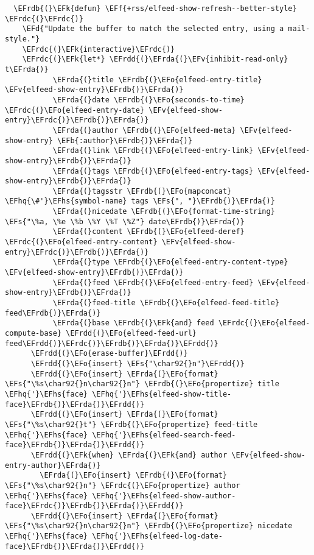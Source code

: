 \documentclass[c]{article}
\theoremstyle{plain}%
\theoremstyle{definition}
\theoremstyle{remark}
\newcommand{\EFs}[1]{\textcolor{EFs}{#1}} %
\newcommand{\EFd}[1]{\textcolor{EFd}{#1}} %
\newcommand{\EFk}[1]{\textcolor{EFk}{#1}} %
\newcommand{\EFb}[1]{\textcolor{EFb}{#1}} %
\newcommand{\EFf}[1]{\textcolor{EFf}{#1}} %
\newcommand{\EFv}[1]{\textcolor{EFv}{#1}} %
\newcommand{\EFo}[1]{\textcolor{EFo}{#1}} %
\newcommand{\EFhq}[1]{\textcolor{EFhq}{#1}} %
\newcommand{\EFhs}[1]{\textcolor{EFhs}{#1}} %
\newcommand{\EFrda}[1]{\textcolor{EFrda}{#1}} %
\newcommand{\EFrdb}[1]{\textcolor{EFrdb}{#1}} %
\newcommand{\EFrdc}[1]{\textcolor{EFrdc}{#1}} %
\newcommand{\EFrdd}[1]{\textcolor{EFrdd}{#1}} %
\begin{document}
\begin{Code}
\begin{Verbatim}
  \EFrdb{(}\EFk{defun} \EFf{+rss/elfeed-show-refresh--better-style} \EFrdc{(}\EFrdc{)}
    \EFd{"Update the buffer to match the selected entry, using a mail-style."}
    \EFrdc{(}\EFk{interactive}\EFrdc{)}
    \EFrdc{(}\EFk{let*} \EFrdd{(}\EFrda{(}\EFv{inhibit-read-only} t\EFrda{)}
           \EFrda{(}title \EFrdb{(}\EFo{elfeed-entry-title} \EFv{elfeed-show-entry}\EFrdb{)}\EFrda{)}
           \EFrda{(}date \EFrdb{(}\EFo{seconds-to-time} \EFrdc{(}\EFo{elfeed-entry-date} \EFv{elfeed-show-entry}\EFrdc{)}\EFrdb{)}\EFrda{)}
           \EFrda{(}author \EFrdb{(}\EFo{elfeed-meta} \EFv{elfeed-show-entry} \EFb{:author}\EFrdb{)}\EFrda{)}
           \EFrda{(}link \EFrdb{(}\EFo{elfeed-entry-link} \EFv{elfeed-show-entry}\EFrdb{)}\EFrda{)}
           \EFrda{(}tags \EFrdb{(}\EFo{elfeed-entry-tags} \EFv{elfeed-show-entry}\EFrdb{)}\EFrda{)}
           \EFrda{(}tagsstr \EFrdb{(}\EFo{mapconcat} \EFhq{\#'}\EFhs{symbol-name} tags \EFs{", "}\EFrdb{)}\EFrda{)}
           \EFrda{(}nicedate \EFrdb{(}\EFo{format-time-string} \EFs{"\%a, \%e \%b \%Y \%T \%Z"} date\EFrdb{)}\EFrda{)}
           \EFrda{(}content \EFrdb{(}\EFo{elfeed-deref} \EFrdc{(}\EFo{elfeed-entry-content} \EFv{elfeed-show-entry}\EFrdc{)}\EFrdb{)}\EFrda{)}
           \EFrda{(}type \EFrdb{(}\EFo{elfeed-entry-content-type} \EFv{elfeed-show-entry}\EFrdb{)}\EFrda{)}
           \EFrda{(}feed \EFrdb{(}\EFo{elfeed-entry-feed} \EFv{elfeed-show-entry}\EFrdb{)}\EFrda{)}
           \EFrda{(}feed-title \EFrdb{(}\EFo{elfeed-feed-title} feed\EFrdb{)}\EFrda{)}
           \EFrda{(}base \EFrdb{(}\EFk{and} feed \EFrdc{(}\EFo{elfeed-compute-base} \EFrdd{(}\EFo{elfeed-feed-url} feed\EFrdd{)}\EFrdc{)}\EFrdb{)}\EFrda{)}\EFrdd{)}
      \EFrdd{(}\EFo{erase-buffer}\EFrdd{)}
      \EFrdd{(}\EFo{insert} \EFs{"\char92{}n"}\EFrdd{)}
      \EFrdd{(}\EFo{insert} \EFrda{(}\EFo{format} \EFs{"\%s\char92{}n\char92{}n"} \EFrdb{(}\EFo{propertize} title \EFhq{'}\EFhs{face} \EFhq{'}\EFhs{elfeed-show-title-face}\EFrdb{)}\EFrda{)}\EFrdd{)}
      \EFrdd{(}\EFo{insert} \EFrda{(}\EFo{format} \EFs{"\%s\char92{}t"} \EFrdb{(}\EFo{propertize} feed-title \EFhq{'}\EFhs{face} \EFhq{'}\EFhs{elfeed-search-feed-face}\EFrdb{)}\EFrda{)}\EFrdd{)}
      \EFrdd{(}\EFk{when} \EFrda{(}\EFk{and} author \EFv{elfeed-show-entry-author}\EFrda{)}
        \EFrda{(}\EFo{insert} \EFrdb{(}\EFo{format} \EFs{"\%s\char92{}n"} \EFrdc{(}\EFo{propertize} author \EFhq{'}\EFhs{face} \EFhq{'}\EFhs{elfeed-show-author-face}\EFrdc{)}\EFrdb{)}\EFrda{)}\EFrdd{)}
      \EFrdd{(}\EFo{insert} \EFrda{(}\EFo{format} \EFs{"\%s\char92{}n\char92{}n"} \EFrdb{(}\EFo{propertize} nicedate \EFhq{'}\EFhs{face} \EFhq{'}\EFhs{elfeed-log-date-face}\EFrdb{)}\EFrda{)}\EFrdd{)}

\end{Verbatim}
\end{Code}
\end{document}
